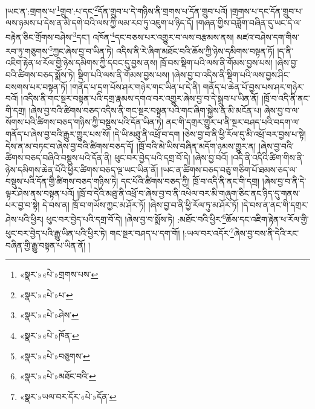 །ཡང་ན་:གྲགས་པ་\footnote{«སྣར་»«པེ་»གྲགས་པས་}གྲུབ་:པ་དང་\footnote{«སྣར་»«པེ་»པ་}དོན་གྲུབ་པ་དེ་གཉིས་ནི་གྲགས་པ་དོན་གྲུབ་པའོ། །གྲགས་པ་དང་དོན་གྲུབ་པ་ལས་ཉམས་པ་དེས་ན་མི་དགེ་བའི་ལས་ཀྱི་ལམ་རབ་ཏུ་འཇུག་པ་ཉིད་དོ། །གཞན་གྱིས་བཟློག་བཞིན་དུ་ཡང་དེ་ལ་བརྟེན་ཅིང་གྲོགས་བཤེས་\footnote{«སྣར་»«པེ་»ཤེས་}དང་། འཁོན་\footnote{«སྣར་»«པེ་»ཁོན་}དང་བཅས་པར་འགྱུར་བ་ལས་བརྩམས་ནས། མཛའ་བཤེས་དག་གིས་རབ་ཏུ་གཅུགས་\footnote{«སྣར་»«པེ་»བཅུགས་}ཀྱང་ཞེས་བྱ་བ་ཡིན་ཏེ། འདིས་ནི་རེ་ཞིག་མཐོང་བའི་ཆོས་ཀྱི་ཉེས་དམིགས་བསྟན་ཏོ། །ད་ནི་འཇིག་རྟེན་ཕ་རོལ་གྱི་ཉེས་དམིགས་ཀྱི་དབང་དུ་བྱས་ནས། ཁྲོ་བས་སྡིག་པའི་ལས་ནི་གོམས་བྱས་པས། །ཞེས་བྱ་བའི་ཚིགས་བཅད་སྨོས་ཏེ། སྡིག་པའི་ལས་ནི་གོམས་བྱས་པས། །ཞེས་བྱ་བ་འདིས་ནི་སྡིག་པའི་ལས་བྱས་ཤིང་བསགས་པར་བསྟན་ཏོ། །གནོད་པ་དྲག་པོས་ཤར་གཉེར་གང་ཡིན་པ་དེ་ནི། གནོད་པ་ཆེན་པོ་བྱས་པས་ཤར་གཉེར་བའོ། །འདིས་ནི་གང་སྔར་བསྟན་པའི་དགྲ་རྣམས་དགའ་བར་འགྱུར་ཞེས་བྱ་བ་དེ་སྒྲུབ་པ་ཡིན་ནོ། །ཁྲོ་བ་འདི་ནི་ནང་གི་དགྲ། །ཞེས་བྱ་བའི་ཚིགས་བཅད་འདིས་ནི་གང་སྔར་བསྟན་པའི་གང་ཞིག་སྐྱེས་ན་མི་མངོན་པ། ཞེས་བྱ་བ་ལ་སོགས་པའི་ཚིགས་བཅད་གཉིས་ཀྱི་བསྡུས་པའི་དོན་ཡིན་ཏེ། ནང་གི་དགྲར་གྱུར་པ་ནི་སྔར་བཤད་པའི་བདག་ལ་གནོད་པ་ཞེས་བྱ་བའི་རྒྱུར་གྱུར་པས་སོ། །དེ་ཡི་མཐུ་ནི་འཕྲོ་བ་དག །ཅེས་བྱ་བ་ནི་ཕྱི་རོལ་དུ་མི་འཕྲོ་བར་བྱས་པ་སྟེ། དེས་ན་མ་བཏང་བ་ཞེས་བྱ་བའི་ཚིགས་བཅད་དོ། །ཁྲོ་བའི་མེ་ཡིས་བཞིན་མདོག་ཉམས་གྱུར་ན། །ཞེས་བྱ་བའི་ཚིགས་བཅད་བཞིའི་བསྡུས་པའི་དོན་ནི། ཕུང་བར་བྱེད་པའི་དགྲ་བོ་དེ། །ཞེས་བྱ་བའོ། །འདི་ནི་འདིའི་ཚིག་གིས་ནི་ཉེས་དམིགས་ཆེན་པོའི་ཕྱིར་ཚིགས་བཅད་ལྔ་ཡང་ཡིན་ནོ། །ཡང་ན་ཚིགས་བཅད་བཅུ་གཅིག་པོ་ཐམས་ཅད་ལ་བསྡུས་པའི་དོན་གྱི་ཚིགས་བཅད་གཉིས་ཏེ། དང་པོའི་ཚིགས་བཅད་ཀྱི། ཁྲོ་བ་འདི་ནི་ནང་གི་དགྲ། །ཞེས་བྱ་བ་ནི་དེ་ལྟར་ཤེས་ནས་བསྟན་པའོ། །ཁྲོ་བ་དེའི་མཐུ་ནི་འཕྲོ་བ་ཞེས་བྱ་བ་ནི་འཕེལ་བར་མི་གཞུག་ཅིང་ནང་ཉིད་དུ་གནས་པར་བྱ་བ་སྟེ། དེ་བས་ན། ཁྲོ་བ་གཡོས་ཀྱང་མ་ཤོར་ཏོ། །ཞེས་བྱ་བ་ནི་ཕྱི་རོལ་ཏུ་མ་ཤོར་ཏོ། །དེ་བས་ན་ནང་གི་དགྲར་ཤེས་པའི་ཕྱིར། ཕུང་བར་བྱེད་པའི་དགྲ་བོ་དེ། །ཞེས་བྱ་བ་སྨོས་ཏེ། :མཐོང་བའི་ཕྱིར་\footnote{«སྣར་»«པེ་»མཐོང་བའི་}ཆོས་དང་འཇིག་རྟེན་ཕ་རོལ་གྱི་ཕུང་བར་བྱེད་པའི་རྒྱུ་ཡིན་པའི་ཕྱིར་ཏེ། གང་སྔར་བཤད་པ་དག་གོ། །:ཡལ་བར་འདོར་\footnote{«སྣར་»ཡལ་བར་དོར་«པེ་»དོན་}ཞེས་བྱ་བས་ནི་དེའི་རང་བཞིན་གྱི་རྒྱུ་བསྟན་པ་ཡིན་ནོ། །
